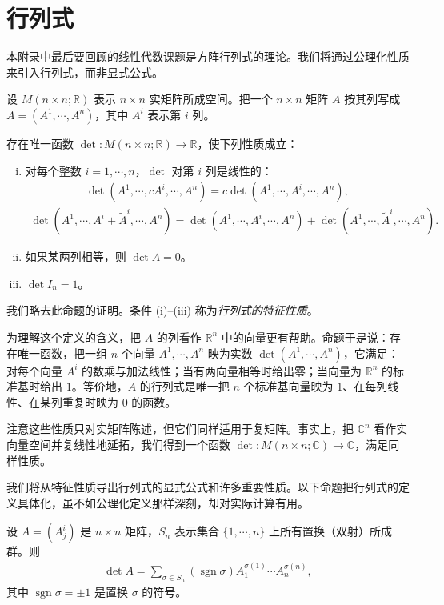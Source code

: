 \documentclass[../../main.tex]{subfiles}
\begin{document}
\section{行列式}\label{section:appB-the-determinant}

本附录中最后要回顾的线性代数课题是方阵行列式的理论。我们将通过公理化性质来引入行列式，而非显式公式。

设 $M(n\times n;\mathbb R)$ 表示 $n\times n$ 实矩阵所成空间。把一个 $n\times n$ 矩阵 $A$ 按其列写成 $A=(A^1,\cdots ,A^n)$，其中 $A^i$ 表示第 $i$ 列。

\begin{proposition}\label{proposition:appB-determinant-axioms}
存在唯一函数 $\det:M(n\times n;\mathbb R)\to\mathbb R$，使下列性质成立：
\begin{enumerate}[(i)]
\item 对每个整数 $i=1,\cdots ,n$，$\det$ 对第 $i$ 列是线性的：
\begin{align*}
\det(A^1,\cdots ,cA^i,\cdots ,A^n)=c\det(A^1,\cdots ,A^i,\cdots ,A^n),
\end{align*}
\begin{align*}
\det(A^1,\cdots ,A^i+\widetilde A^i,\cdots ,A^n)
=\det(A^1,\cdots ,A^i,\cdots ,A^n)+\det(A^1,\cdots ,\widetilde A^i,\cdots ,A^n).
\end{align*}
\item 如果某两列相等，则 $\det A=0$。
\item $\det I_n=1$。
\end{enumerate}
\end{proposition}

我们略去此命题的证明。条件 (i)--(iii) 称为\emph{行列式的特征性质}。

为理解这个定义的含义，把 $A$ 的列看作 $\mathbb R^n$ 中的向量更有帮助。命题于是说：存在唯一函数，把一组 $n$ 个向量 $A^1,\cdots ,A^n$ 映为实数 $\det(A^1,\cdots ,A^n)$，它满足：对每个向量 $A^i$ 的数乘与加法线性；当有两向量相等时给出零；当向量为 $\mathbb R^n$ 的标准基时给出 $1$。等价地，$A$ 的行列式是唯一把 $n$ 个标准基向量映为 $1$、在每列线性、在某列重复时映为 $0$ 的函数。

注意这些性质只对实矩阵陈述，但它们同样适用于复矩阵。事实上，把 $\mathbb C^n$ 看作实向量空间并复线性地延拓，我们得到一个函数 $\det:M(n\times n;\mathbb C)\to\mathbb C$，满足同样性质。

我们将从特征性质导出行列式的显式公式和许多重要性质。以下命题把行列式的定义具体化，虽不如公理化定义那样深刻，却对实际计算有用。

\begin{proposition}\label{proposition:appB-determinant-formula}
设 $A=(A^i_j)$ 是 $n\times n$ 矩阵，$S_n$ 表示集合 $\{1,\cdots ,n\}$ 上所有置换（双射）所成群。则
\begin{align}\label{align:appB-det-formula}
\det A=\sum_{\sigma\in S_n}(\operatorname{sgn}\sigma)A^{\sigma(1)}_1\cdots A^{\sigma(n)}_n,
\end{align}
其中 $\operatorname{sgn}\sigma=\pm1$ 是置换 $\sigma$ 的符号。
\end{proposition}
\end{document}
